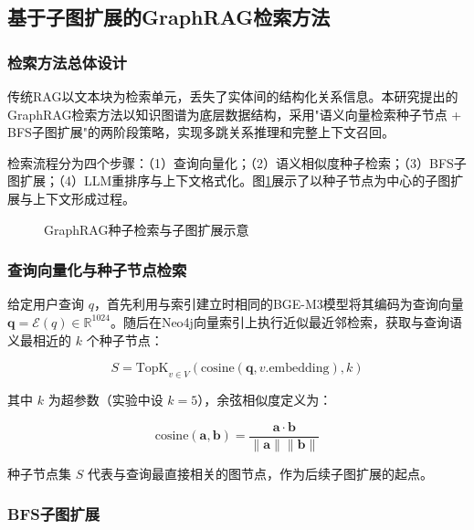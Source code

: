 \subsection{基于子图扩展的GraphRAG检索方法}

\subsubsection{检索方法总体设计}

传统RAG以文本块为检索单元，丢失了实体间的结构化关系信息。本研究提出的GraphRAG检索方法以知识图谱为底层数据结构，采用"语义向量检索种子节点 + BFS子图扩展"的两阶段策略，实现多跳关系推理和完整上下文召回。

检索流程分为四个步骤：（1）查询向量化；（2）语义相似度种子检索；（3）BFS子图扩展；（4）LLM重排序与上下文格式化。图\ref{fig:graphrag_expansion}展示了以种子节点为中心的子图扩展与上下文形成过程。

\begin{figure}[htbp]
\centering

\caption{GraphRAG种子检索与子图扩展示意}
\label{fig:graphrag_expansion}
\end{figure}

\subsubsection{查询向量化与种子节点检索}

给定用户查询 $q$，首先利用与索引建立时相同的BGE-M3模型将其编码为查询向量 $\mathbf{q} = \mathcal{E}(q) \in \mathbb{R}^{1024}$。随后在Neo4j向量索引上执行近似最近邻检索，获取与查询语义最相近的 $k$ 个种子节点：

\begin{equation}
S = \text{TopK}_{v \in V}\left(\text{cosine}(\mathbf{q}, v.\text{embedding}), k\right)
\end{equation}

其中 $k$ 为超参数（实验中设 $k=5$），余弦相似度定义为：

\begin{equation}
\text{cosine}(\mathbf{a}, \mathbf{b}) = \frac{\mathbf{a} \cdot \mathbf{b}}{\|\mathbf{a}\| \|\mathbf{b}\|}
\end{equation}

种子节点集 $S$ 代表与查询最直接相关的图节点，作为后续子图扩展的起点。

\subsubsection{BFS子图扩展}

